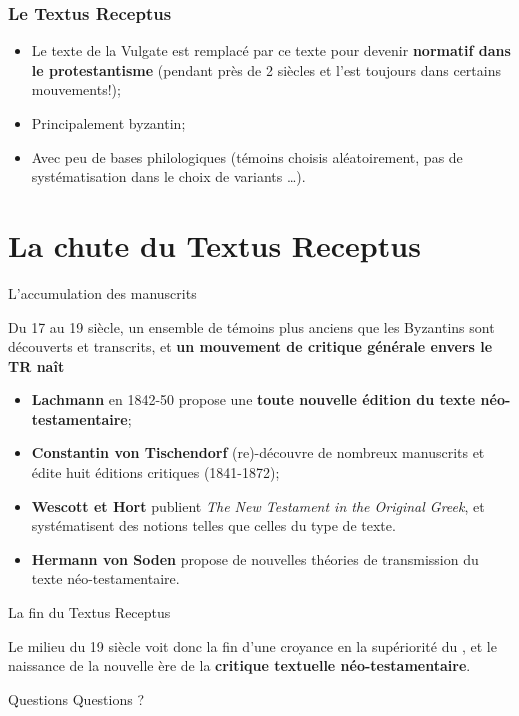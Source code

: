 \documentclass[11pt]{beamer}
\begin{document}
\begin{frame}
  \frametitle{Le Textus Receptus}
    \begin{itemize}
        \item Le texte de la Vulgate est remplacé par ce texte pour devenir \textbf{normatif dans le protestantisme} (pendant près de 2 siècles et l'est toujours dans certains mouvements!);
        \item Principalement byzantin;
        \item Avec peu de bases philologiques (témoins choisis aléatoirement, pas de systématisation dans le choix de variants \dots).
    \end{itemize}
\end{frame}

\section{La chute du Textus Receptus}

\begin{frame}{L'accumulation des manuscrits}
\begin{alertblock}{}
    Du 17\ieme{} au 19\ieme{} siècle, un ensemble de témoins plus anciens que les Byzantins sont découverts et transcrits, et \textbf{un mouvement de critique générale envers le TR naît}
\end{alertblock}
\begin{itemize}
    \item \textbf{Lachmann} en 1842-50 propose une \textbf{toute nouvelle édition du texte néo-testamentaire};
    \item \textbf{Constantin von Tischendorf} (re)-découvre de nombreux manuscrits et édite huit éditions critiques (1841-1872);
    \item \textbf{Wescott et Hort} publient \textit{The New Testament in the Original Greek}, et systématisent des notions telles que celles du type de texte.
    \item \textbf{Hermann von Soden} propose de nouvelles théories de transmission du texte néo-testamentaire.
\end{itemize}
\end{frame}

\begin{frame}{La fin du Textus Receptus}
\begin{alertblock}{}
       Le milieu du 19\ieme{} siècle voit donc la fin d'une croyance en la supériorité du , et le naissance de la nouvelle ère de la \textbf{critique textuelle néo-testamentaire}. 
\end{alertblock}
\end{frame}

\begin{frame}{Questions}
    Questions ?
\end{frame}
\end{document}
